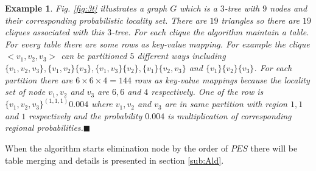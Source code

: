 \documentclass[12pt]{article}
\newtheorem{exmp}{Example}[section]
\begin{document}
\begin{exmp}
\normalfont
Fig. \ref{fig:3t} illustrates a graph $G$ which is a $3$-tree with $9$ nodes and their corresponding probabilistic locality set. There are $19$ triangles so there are $19$ cliques associated with this $3$-tree. For each clique the algorithm maintain a table. For every table there are some rows as key-value mapping. For example the clique $<v_1,v_2,v_3>$  can be partitioned $5$ different ways including $\{v_1,v_2,v_3\}, \{v_1,v_2\}\{v_3\}, \{v_1,v_3\}\{v_2\},\{v_1\}\{v_2,v_3\}$ and $\{v_1\}\{v_2\}\{v_3\} $. For each partition there are  $6\times6\times4=144$ rows as key-value mappings because the locality set of node $v_1,v_2$ and $v_3$ are $6,6$ and $4$ respectively. One of the row is ${\{v_1,v_2,v_3\}}^{(1,1,1)} 0.004$ where $v_1,v_2$ and $v_3$ are in same partition with region $1, 1$ and $1$ respectively and the probability $0.004$ is multiplication of corresponding regional probabilities.$\blacksquare$
\end{exmp}
When the algorithm starts elimination node by the order of $PES$ there will be table merging and details is presented in section \ref{sub:Ald}.
\end{document}
